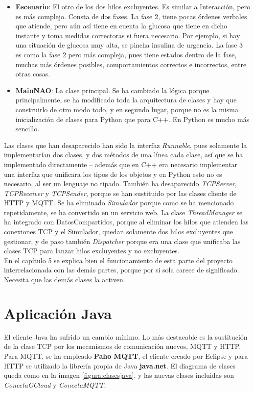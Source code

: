 \documentclass[12pt,spanish,listoffigures,listoftables]{tfgetsinf}
\begin{document}
\begin{itemize}
	\item \textbf{Escenario}: El otro de los dos hilos excluyentes. Es similar a Interacción, pero es más complejo. Consta de dos fases. La fase 2, tiene pocas órdenes verbales que atiende, pero aún así tiene en cuenta la glucosa que tiene en dicho instante y toma medidas correctoras si fuera necesario. Por ejemplo, si hay una situación de glucosa muy alta, se pincha insulina de urgencia. La fase 3 es como la fase 2 pero más compleja, pues tiene estados dentro de la fase, muchas más órdenes posibles, comportamientos correctos e incorrectos, entre otras cosas.
	\item \textbf{MainNAO}: La clase principal. Se ha cambiado la lógica porque principalmente, se ha modificado toda la arquitectura de clases y hay que construirlo de otro modo todo, y en segundo lugar, porque no es la misma inicialización de clases para Python que para C++. En Python es mucho más sencillo.
\end{itemize}

Las clases que han desaparecido han sido la interfaz \textit{Runnable}, pues solamente la implementarían dos clases, y dos métodos de una línea cada clase, así que se ha implementado directamente -- además que en C++ era necesario implementar una interfaz que unificara los tipos de los objetos y en Python esto no es necesario, al ser un lenguaje no tipado. También ha desaparecido \textit{TCPServer}, \textit{TCPReceiver} y \textit{TCPSender}, porque se han sustituido por las clases cliente de HTTP y MQTT. Se ha eliminado \textit{Simulador} porque como se ha mencionado repetidamente, se ha convertido en un servicio web. La clase \textit{ThreadManager} se ha integrado con DatosCompartidos, porque al eliminar los hilos que atienden las conexiones TCP y el Simulador, quedan solamente dos hilos excluyentes que gestionar, y de paso también \textit{Dispatcher} porque era una clase que unificaba las clases TCP para lanzar hilos excluyentes y no excluyentes. \\

En el capítulo 5 se explica bien el funcionamiento de esta parte del proyecto interrelacionada con las demás partes, porque por si sola carece de significado. Necesita que las demás clases la activen.

\chapter{Aplicación Java}

El cliente Java ha sufrido un cambio mínimo. Lo más destacable es la sustitución de la clase TCP por los mecanismos de comunicación nuevos, MQTT y HTTP. Para MQTT, se ha empleado \textbf{Paho MQTT}, el cliente creado por Eclipse y para HTTP se utilizado la librería propia de Java \textbf{java.net}. El diagrama de clases queda como en la imagen  \ref{figura:clasesjava}, y las nuevas clases incluidas son \textit{ConectaGCloud} y \textit{ConectaMQTT}.
\end{document}

